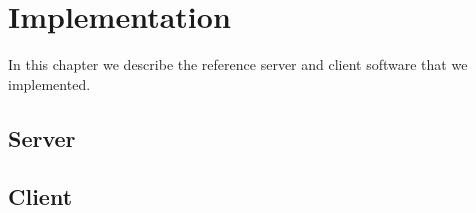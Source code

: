 
\chapter{Implementation}

In this chapter we describe the reference server and client software that we implemented.

\section{Server}

\section{Client}

